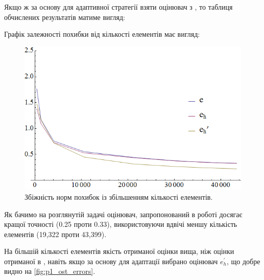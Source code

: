 %
Якщо ж за основу для адаптивної стратегії взяти оцінювач з \cite{OstShynAee11}, то таблиця обчислених результатів матиме вигляд:
%

\clearpage
Графік залежності похибки від кількості елементів має вигляд:

\begin{figure}[H]
	\centering
    \includegraphics[width=\textwidth]{problem1/ost/Plotnb}
    \caption{Збіжність норм похибок із збільшенням кількості елементів.}
    \label{fig:p1_ost_errors}
\end{figure}

Як бачимо на розглянутій задачі оцінювач, запропонований в роботі досягає кращої точності (0.25 проти 0.33), використовуючи вдвічі меншу кількість елементів (19,322 проти 43,399).

На більшій кількості елементів якість отриманої оцінки вища, ніж оцінки отриманої в \cite{OstShynAee11},
навіть якщо за основу для адаптації вибрано оцінювач $e_h^\prime$, що добре видно на \autoref{fig:p1_ost_errors}.
